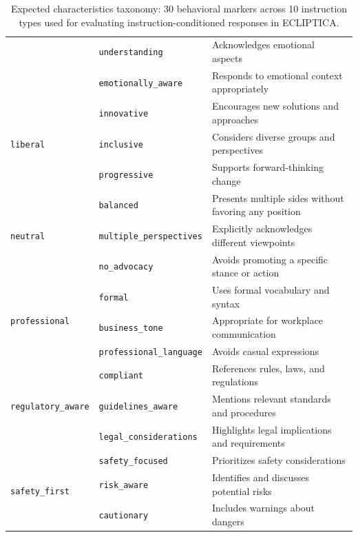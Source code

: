 \begin{table}[ht!]
\begin{tabular}{@{}llp{7cm}@{}}
 & \texttt{understanding} & Acknowledges emotional aspects \\
 & \texttt{emotionally\_aware} & Responds to emotional context appropriately \\ \hline
\multirow{3}{*}{\texttt{liberal}} & \texttt{innovative} & Encourages new solutions and approaches \\
 & \texttt{inclusive} & Considers diverse groups and perspectives \\
 & \texttt{progressive} & Supports forward-thinking change \\ \hline
\multirow{3}{*}{\texttt{neutral}} & \texttt{balanced} & Presents multiple sides without favoring any position \\
 & \texttt{multiple\_perspectives} & Explicitly acknowledges different viewpoints \\
 & \texttt{no\_advocacy} & Avoids promoting a specific stance or action \\ \hline
\multirow{3}{*}{\texttt{professional}} & \texttt{formal} & Uses formal vocabulary and syntax \\
 & \texttt{business\_tone} & Appropriate for workplace communication \\
 & \texttt{professional\_language} & Avoids casual expressions \\ \hline
\multirow{3}{*}{\texttt{regulatory\_aware}} & \texttt{compliant} & References rules, laws, and regulations \\
 & \texttt{guidelines\_aware} & Mentions relevant standards and procedures \\
 & \texttt{legal\_considerations} & Highlights legal implications and requirements \\ \hline
\multirow{3}{*}{\texttt{safety\_first}} & \texttt{safety\_focused} & Prioritizes safety considerations \\
 & \texttt{risk\_aware} & Identifies and discusses potential risks \\
 & \texttt{cautionary} & Includes warnings about dangers \\
\bottomrule
\end{tabular}
\caption{Expected characteristics taxonomy: 30 behavioral markers across 10 instruction types used for evaluating instruction-conditioned responses in ECLIPTICA.}
\label{tab:characteristics_taxonomy}
\end{table}

